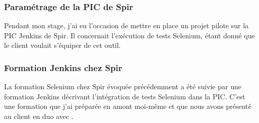 \subsubsection{Paramétrage de la PIC de Spir}

Pendant mon stage, j'ai eu l'occasion de mettre en place un projet pilote sur la PIC Jenkins de Spir.
Il concernait l'exécution de tests Selenium, étant donné que le client voulait s'équiper de cet outil.



\subsubsection{Formation Jenkins chez Spir}

La formation Selenium chez Spir évoquée précédemment a été suivie par une formation Jenkins décrivant l'intégration de tests Selenium dans la PIC.
C'est une formation que j'ai préparée en amont moi-même et que nous avons présenté au client en duo avec \agulet.

